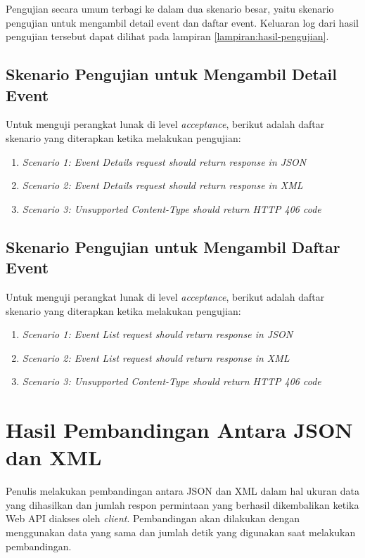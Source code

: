 \documentclass[a4paper, 12pt, oneside]{report}
\begin{document}
Pengujian secara umum terbagi ke dalam dua skenario besar, yaitu skenario pengujian untuk mengambil detail event dan daftar event. Keluaran log dari hasil pengujian tersebut dapat dilihat pada lampiran \ref{lampiran:hasil-pengujian}.

\subsection{Skenario Pengujian untuk Mengambil Detail Event}

Untuk menguji perangkat lunak di level \textit{acceptance}, berikut adalah daftar skenario yang diterapkan ketika melakukan pengujian:

\begin{enumerate}
  \item \textit{Scenario 1: Event Details request should return response in JSON}
  \item \textit{Scenario 2: Event Details request should return response in XML}
  \item \textit{Scenario 3: Unsupported Content-Type should return HTTP 406 code}
\end{enumerate}

\subsection{Skenario Pengujian untuk Mengambil Daftar Event}

Untuk menguji perangkat lunak di level \textit{acceptance}, berikut adalah daftar skenario yang diterapkan ketika melakukan pengujian:

\begin{enumerate}
  \item \textit{Scenario 1: Event List request should return response in JSON}
  \item \textit{Scenario 2: Event List request should return response in XML}
  \item \textit{Scenario 3: Unsupported Content-Type should return HTTP 406 code}
\end{enumerate}

\section{Hasil Pembandingan Antara JSON dan XML}

Penulis melakukan pembandingan antara JSON dan XML dalam hal ukuran data yang dihasilkan dan jumlah respon permintaan yang berhasil dikembalikan ketika Web API diakses oleh \textit{client}. Pembandingan akan dilakukan dengan menggunakan data yang sama dan jumlah detik yang digunakan saat melakukan pembandingan.
\end{document}
